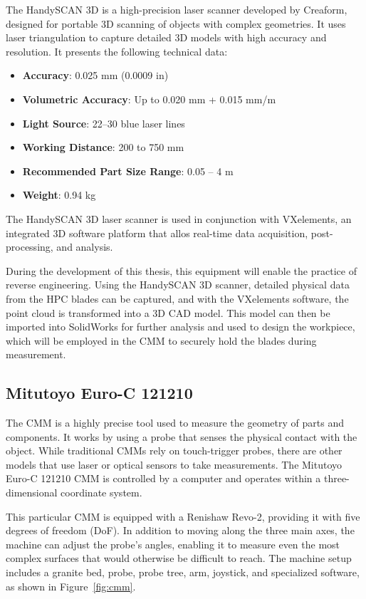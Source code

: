 The HandySCAN 3D is a high-precision laser scanner developed by Creaform, designed for portable 3D scanning of objects with complex geometries. It uses laser triangulation to capture detailed 3D models with high accuracy and resolution.
It presents the following technical data: 
\begin{itemize}
    \item \textbf{Accuracy}: 0.025 mm (0.0009 in)
    \item \textbf{Volumetric Accuracy}: Up to 0.020 mm + 0.015 mm/m
    \item \textbf{Light Source}: 22–30 blue laser lines
    \item \textbf{Working Distance}: 200 to 750 mm
    \item \textbf{Recommended Part Size Range}: 0.05 – 4 m
    \item \textbf{Weight}: 0.94 kg
\end{itemize}

The HandySCAN 3D laser scanner is used in conjunction with VXelements, an integrated 3D software platform that allos real-time data acquisition, post-processing, and analysis.

During the development of this thesis, this equipment will enable the practice of reverse engineering. Using the HandySCAN 3D scanner, detailed physical data from the \gls{HPC} blades can be captured, and with the VXelements software, the point cloud is transformed into a 3D \gls{CAD} model. This model can then be imported into SolidWorks for further analysis and used to design the workpiece, which will be employed in the \gls{CMM} to securely hold the blades during measurement.

\subsection{Mitutoyo Euro-C 121210}
\label{sec:cmm}

The \gls{CMM} is a highly precise tool used to measure the geometry of parts and components. It works by using a probe that senses the physical contact with the object. While traditional CMMs rely on touch-trigger probes, there are other models that use laser or optical sensors to take measurements. The Mitutoyo Euro-C 121210 \gls{CMM} is controlled by a computer and operates within a three-dimensional coordinate system.

This particular CMM is equipped with a Renishaw Revo-2, providing it with five degrees of freedom (DoF). In addition to moving along the three main axes, the machine can adjust the probe’s angles, enabling it to measure even the most complex surfaces that would otherwise be difficult to reach. The machine setup includes a granite bed, probe, probe tree, arm, joystick, and specialized software, as shown in Figure~\ref{fig:cmm}.

